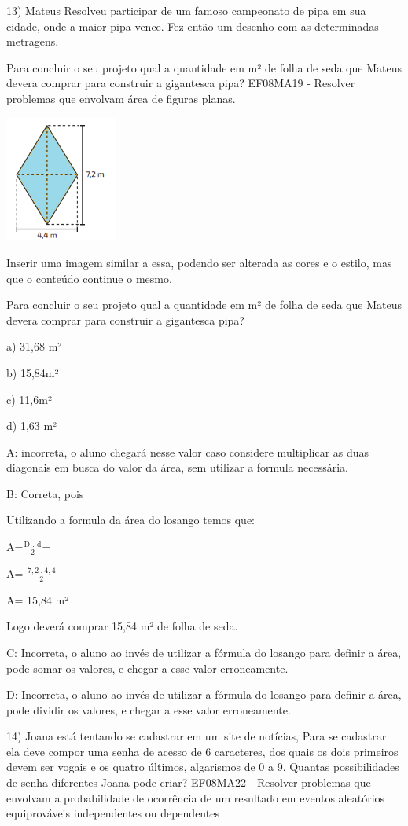 {13) Mateus Resolveu participar de um famoso campeonato de pipa em sua
cidade, onde a maior pipa vence. Fez então um desenho com as
determinadas metragens.

Para concluir o seu projeto qual a quantidade em m² de folha de seda que
Mateus devera comprar para construir a gigantesca pipa? EF08MA19 -
Resolver problemas que envolvam área de figuras planas.

\includegraphics[width=1.45833in,height=1.63333in]{./imgSAEB_8_MAT/media/image59.png}

Inserir uma imagem similar a essa, podendo ser alterada as cores e o
estilo, mas que o conteúdo continue o mesmo.

Para concluir o seu projeto qual a quantidade em m² de folha de seda que
Mateus devera comprar para construir a gigantesca pipa?

a) 31,68 m²

b) 15,84m²

c) 11,6m²

d) 1,63 m²

A: incorreta, o aluno chegará nesse valor caso considere multiplicar as
duas diagonais em busca do valor da área, sem utilizar a formula
necessária.

B: Correta, pois

Utilizando a formula da área do losango temos que:

A=\(\frac{\text{D\ .\ d}}{2}\)=

A= \(\frac{7,2\ .\ 4,4}{2}\)

A= 15,84 m²

Logo deverá comprar 15,84 m² de folha de seda.

C: Incorreta, o aluno ao invés de utilizar a fórmula do losango para
definir a área, pode somar os valores, e chegar a esse valor
erroneamente.

D: Incorreta, o aluno ao invés de utilizar a fórmula do losango para
definir a área, pode dividir os valores, e chegar a esse valor
erroneamente.

14) Joana está tentando se cadastrar em um site de notícias, Para se
cadastrar ela deve compor uma senha de acesso de 6 caracteres, dos quais
os dois primeiros devem ser vogais e os quatro últimos, algarismos de 0
a 9. Quantas possibilidades de senha diferentes Joana pode criar?
EF08MA22 - Resolver problemas que envolvam a probabilidade de ocorrência
de um resultado em eventos aleatórios equiprováveis independentes ou
dependentes

}
